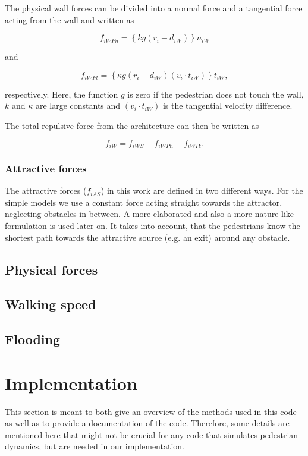 \documentclass[11pt]{article}
\begin{document}
The physical wall forces can be divided into a normal force and a tangential force acting from the wall and written as

\begin{equation}
	{f_{iWPn}} = \left\{ {kg\left( {{r_i} - {d_{iW}}} \right)} \right\}{n_{iW}}
	\label{eq:fiWPn}
\end{equation}

and

\begin{equation}
	{f_{iWPt}} = \left\{ {\kappa g\left( {{r_i} - {d_{iW}}} \right)\left( {{v_i} \cdot {t_{iW}}} \right)} \right\}{t_{iW}} ,
	\label{eq:fiWPt}
\end{equation}

respectively. Here, the function $g$ is zero if the pedestrian does not touch the wall, $k$ and $\kappa$ are large constants and $(v_i \cdot t_{iW})$ is the tangential velocity difference.

The total repulsive force from the architecture can then be written as

\begin{equation}
	{f_{iW}} = {f_{iWS}} + {f_{iWPn}} - {f_{iWPt}} .
	\label{eq:fiW}
\end{equation}


\subsubsection{Attractive forces}

The attractive forces ($f_{iAS}$) in this work are defined in two different ways. For the simple models we use a constant force acting straight towards the attractor, neglecting obstacles in between. A more elaborated and also a more nature like formulation is used later on. It takes into account, that the pedestrians know the shortest path towards the attractive source (e.g. an exit) around any obstacle.

\subsection{Physical forces}
\subsection{Walking speed}
\subsection{Flooding}

\section{Implementation}
This section is meant to both give an overview of the methods used in this code as well as to provide a documentation of the code. Therefore, some details are mentioned here that might not be crucial for any code that simulates pedestrian dynamics, but are needed in our implementation. 
\end{document}
